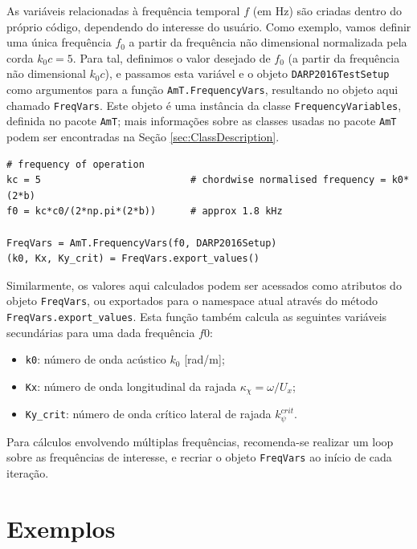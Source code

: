 \documentclass[a4paper, 11pt, twoside]{article}
\newcommand{\AmT}{\texttt{AmT}}
\begin{document}
As variáveis relacionadas à frequência temporal $f$ (em Hz) são criadas dentro do próprio código, dependendo do interesse do usuário. Como exemplo, vamos definir uma única frequência $f_0$ a partir da frequência não dimensional normalizada pela corda $k_0 c = 5$. Para tal, definimos o valor desejado de $f_0$ (a partir da frequência não dimensional $k_0 c$), e passamos esta variável e o objeto \verb|DARP2016TestSetup| como argumentos para a função \verb|AmT.FrequencyVars|, resultando no objeto aqui chamado \verb|FreqVars|. Este objeto é uma instância da classe \verb|FrequencyVariables|, definida no pacote \AmT{}; mais informações sobre as classes usadas no pacote \AmT{} podem ser encontradas na Seção \ref{sec:ClassDescription}. 

\begin{lstlisting}[caption={Criando variáveis relacionadas à frequência},label={lst:FrequencyVars}]
# frequency of operation
kc = 5                          # chordwise normalised frequency = k0*(2*b)
f0 = kc*c0/(2*np.pi*(2*b))      # approx 1.8 kHz

FreqVars = AmT.FrequencyVars(f0, DARP2016Setup)
(k0, Kx, Ky_crit) = FreqVars.export_values()
\end{lstlisting}

Similarmente, os valores aqui calculados podem ser acessados como atributos do objeto \verb|FreqVars|, ou exportados para o namespace atual através do método \verb|FreqVars.export_values|. Esta função também calcula as seguintes variáveis secundárias para uma dada frequência $f0$:

\begin{itemize}
	\item \verb|k0|: número de onda acústico $k_0$ [rad/m];
	\item \verb|Kx|: número de onda longitudinal da rajada $\kappa_\chi = \omega/U_x$;
	\item \verb|Ky_crit|: número de onda crítico lateral de rajada $k_\psi^{crit}$.
\end{itemize}

Para cálculos envolvendo múltiplas frequências, recomenda-se realizar um loop sobre as frequências de interesse, e recriar o objeto \verb|FreqVars| ao início de cada iteração.

\newpage
\section{Exemplos}
\label{sec:Examples}
\end{document}

